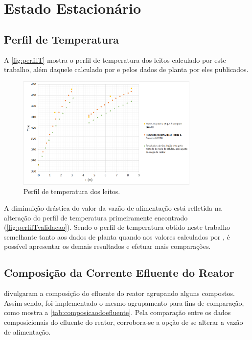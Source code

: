 \section{Estado Estacionário} \label{sec:estadoestacionario}

\subsection{Perfil de Temperatura} \label{sec:perfildetemperatura}

A \autoref{fig:perfilT} mostra o perfil de temperatura dos leitos
calculado por este trabalho, além daquele calculado por 
e pelos dados de planta por eles publicados.  

\begin{figure}[htb]
\centering \includegraphics[width=0.8\textwidth]{images/Chap4/perfilT.png}
\caption{Perfil de temperatura dos leitos.}
\label{fig:perfilT}
\end{figure}

A diminuição drástica do valor da vazão de alimentação está refletida na alteração
do perfil de temperatura primeiramente encontrado
(\autoref{fig:perfilTvalidacao}). Sendo o perfil de temperatura obtido neste
trabalho semelhante tanto aos dados de planta quando aos valores calculados por
, é possível apresentar os demais resultados e efetuar
mais comparações.


\subsection{Composição da Corrente Efluente do Reator}
\label{composicaodacorrenteefluentedoreator}

 divulgaram a composição do efluente do reator agrupando
alguns compostos. Assim sendo, foi implementado o mesmo agrupamento para fins de
comparação, como mostra a \autoref{tab:composicaodoefluente}. Pela comparação
entre os dados composicionais do efluente do reator, corrobora-se a opção de se
alterar a vazão de alimentação.

